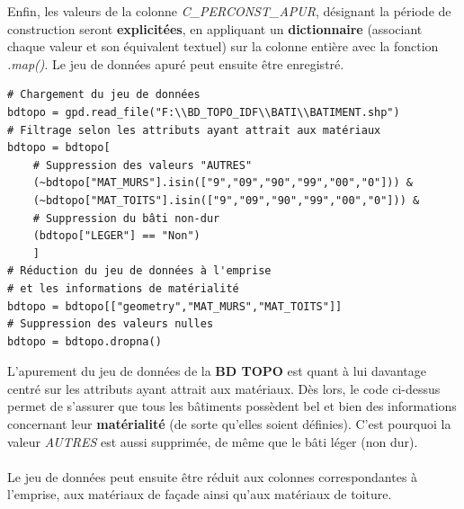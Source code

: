 \documentclass[
  11pt,
  french,
]{article}
\begin{document}
Enfin, les valeurs de la colonne \emph{C\_PERCONST\_APUR}, désignant la
période de construction seront \textbf{explicitées}, en appliquant un
\textbf{dictionnaire} (associant chaque valeur et son équivalent
textuel) sur la colonne entière avec la fonction \emph{.map()}. Le jeu
de données apuré peut ensuite être enregistré.

\begin{tcolorbox}[title= Apurement du jeu de données BD TOPO ,colback=boitecode]
\begin{lstlisting}[style=code]
# Chargement du jeu de données
bdtopo = gpd.read_file("F:\\BD_TOPO_IDF\\BATI\\BATIMENT.shp")
# Filtrage selon les attributs ayant attrait aux matériaux
bdtopo = bdtopo[
    # Suppression des valeurs "AUTRES"
    (~bdtopo["MAT_MURS"].isin(["9","09","90","99","00","0"])) & 
    (~bdtopo["MAT_TOITS"].isin(["9","09","90","99","00","0"])) & 
    # Suppression du bâti non-dur
    (bdtopo["LEGER"] == "Non")
    ]
# Réduction du jeu de données à l'emprise
# et les informations de matérialité
bdtopo = bdtopo[["geometry","MAT_MURS","MAT_TOITS"]]
# Suppression des valeurs nulles
bdtopo = bdtopo.dropna()\end{lstlisting}
\end{tcolorbox}

L'apurement du jeu de données de la \textbf{BD TOPO} est quant à lui
davantage centré sur les attributs ayant attrait aux matériaux. Dès
lors, le code ci-dessus permet de s'assurer que tous les bâtiments
possèdent bel et bien des informations concernant leur
\textbf{matérialité} (de sorte qu'elles soient définies). C'est pourquoi
la valeur \emph{AUTRES} est aussi supprimée, de même que le bâti léger
(non dur).\\
~\\

Le jeu de données peut ensuite être réduit aux colonnes correspondantes
à l'emprise, aux matériaux de façade ainsi qu'aux matériaux de toiture.
\end{document}
